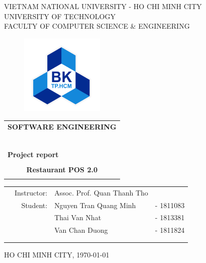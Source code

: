 \documentclass[a4paper,11pt]{extarticle}
\begin{document}
\begin{titlepage}
\begin{center}
VIETNAM NATIONAL UNIVERSITY - HO CHI MINH CITY \\
UNIVERSITY OF TECHNOLOGY \\
FACULTY OF COMPUTER SCIENCE \& ENGINEERING 
\end{center}

\vspace{1cm}

\begin{figure}[h!]
\begin{center}
\includegraphics[width=4cm]{hcmut.png}
\end{center}
\end{figure}

\vspace{1cm}


\begin{center}
\begin{tabular}{c}
\multicolumn{1}{l}{\textbf{{\Large SOFTWARE ENGINEERING}}}\\
~~\\
\hline
\\
\multicolumn{1}{l}{\textbf{{\Large Project report}}}\\
\\
\textbf{{\Huge Restaurant POS 2.0}}\\
\\
\hline
\end{tabular}
\end{center}

\vspace{1cm}

\begin{table}[h]
\begin{tabular}{rrll}
\hspace{3 cm} & Instructor: & Assoc. Prof. Quan Thanh Tho\\
 & Student: & Nguyen Tran Quang Minh & - 1811083 \\
 &          & Thai Van Nhat	& - 1813381 \\
 &          & Van Chan Duong & - 1811824\\ 
\\
\vspace{2cm}
\vspace{2cm}
\end{tabular}
\end{table}

\begin{center}
{\footnotesize HO CHI MINH CITY,  \monthyeardate\today}
\end{center}
\end{titlepage}
\end{document}
